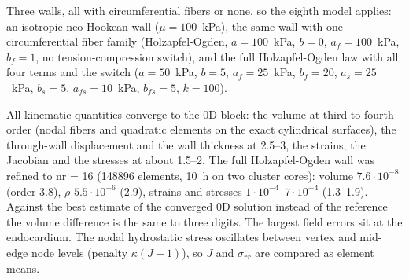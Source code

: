 Three walls, all with circumferential fibers or none, so the eighth model applies:
an isotropic neo-Hookean wall ($\mu = 100$~kPa), the same wall with one circumferential
fiber family (Holzapfel-Ogden, $a = 100$~kPa, $b = 0$, $a_f = 100$~kPa, $b_f = 1$, no
tension-compression switch), and the full Holzapfel-Ogden law with all four terms and the
switch ($a = 50$~kPa, $b = 5$, $a_f = 25$~kPa, $b_f = 20$, $a_s = 25$~kPa, $b_s = 5$,
$a_{fs} = 10$~kPa, $b_{fs} = 5$, $k = 100$).

All kinematic quantities converge to the 0D block: the volume at third to fourth order
(nodal fibers and quadratic elements on the exact cylindrical surfaces), the
through-wall displacement and the wall thickness at 2.5--3, the strains, the Jacobian and
the stresses at about 1.5--2. The full Holzapfel-Ogden wall was refined to nr = 16
(148896 elements, 10~h on two cluster cores): volume $7.6\cdot10^{-8}$ (order 3.8), $\rho$
$5.5\cdot10^{-6}$ (2.9), strains and stresses $1\cdot10^{-4}$--$7\cdot10^{-4}$ (1.3--1.9). Against the
best estimate of the converged 0D solution instead of the reference the volume difference
is the same to three digits. The largest field errors sit at the endocardium. The nodal
hydrostatic stress oscillates between vertex and mid-edge node levels (penalty
$\kappa(J-1)$), so $J$ and $\sigma_{rr}$ are compared as element means.
